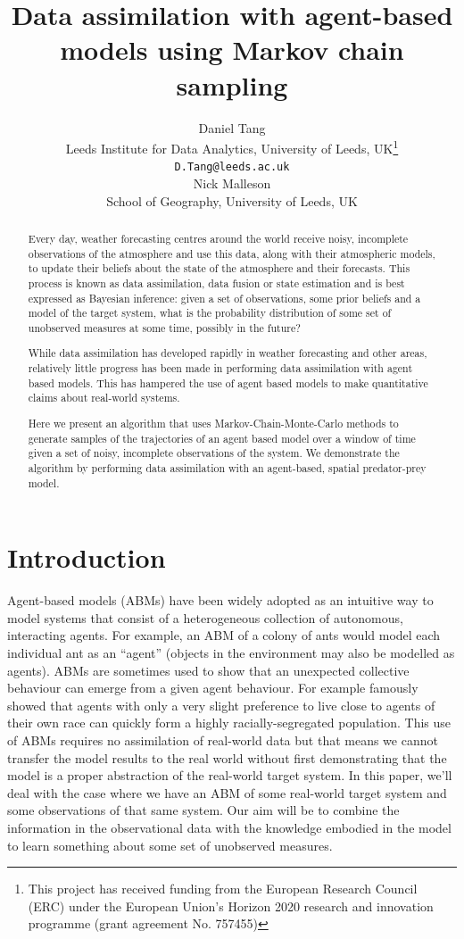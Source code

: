 \documentclass{article}
\title{Data assimilation with agent-based models using Markov chain sampling}
\author{
  Daniel Tang\\
    Leeds Institute for Data Analytics, University of Leeds, UK\thanks{This project has received funding from the European Research Council (ERC) under the European Union’s Horizon 2020 research and innovation programme (grant agreement No. 757455)}\\
  \texttt{D.Tang@leeds.ac.uk}\\
  \AND
  Nick Malleson\\
  School of Geography, University of Leeds, UK\\  
}
\begin{document}
\maketitle

\begin{abstract}
Every day, weather forecasting centres around the world receive noisy, incomplete observations of the atmosphere and use this data, along with their atmospheric models, to update their beliefs about the state of the atmosphere and their forecasts. This process is known as data assimilation, data fusion or state estimation and is best expressed as Bayesian inference: given a set of observations, some prior beliefs and a model of the target system, what is the probability distribution of some set of unobserved measures at some time, possibly in the future?

While data assimilation has developed rapidly in weather forecasting and other areas, relatively little progress has been made in performing data assimilation with agent based models. This has hampered the use of agent based models to make quantitative claims about real-world systems.

Here we present an algorithm that uses Markov-Chain-Monte-Carlo methods to generate samples of the trajectories of an agent based model over a window of time given a set of noisy, incomplete observations of the system. We demonstrate the algorithm by performing data assimilation with an agent-based, spatial predator-prey model.
\end{abstract}


\section{Introduction}

Agent-based models (ABMs) have been widely adopted as an intuitive way to model systems that consist of a heterogeneous collection of autonomous, interacting agents. For example, an ABM of a colony of ants would model each individual ant as an ``agent'' (objects in the environment may also be modelled as agents). ABMs are sometimes used to show that an unexpected collective behaviour can emerge from a given agent behaviour.  For example \citet{schelling1971dynamic} famously showed that agents with only a very slight preference to live close to agents of their own race can quickly form a highly racially-segregated population. This use of ABMs requires no assimilation of real-world data but that means we cannot transfer the model results to the real world without first demonstrating that the model is a proper abstraction of the real-world target system. In this paper, we'll deal with the case where we have an ABM of some real-world target system and some observations of that same system. Our aim will be to combine the information in the observational data with the knowledge embodied in the model to learn something about some set of unobserved measures.
\end{document}
